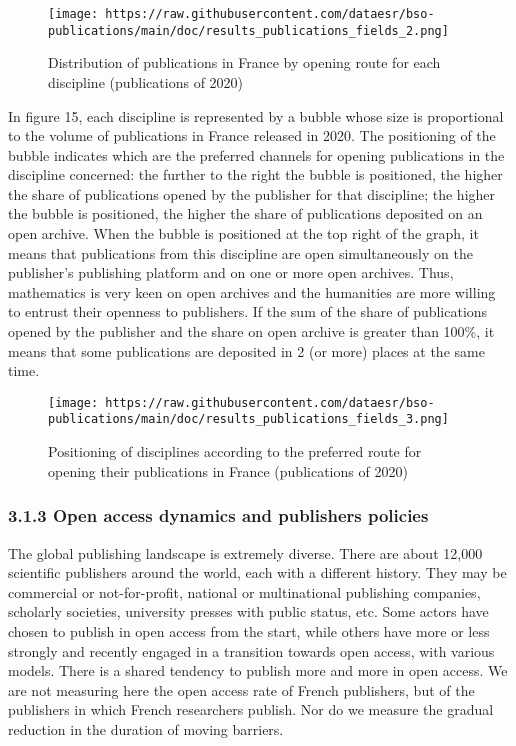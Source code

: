 \documentclass[
]{article}
\begin{document}
\begin{figure}
\centering
\texttt{[image: https://raw.githubusercontent.com/dataesr/bso-publications/main/doc/results\_publications\_fields\_2.png]}
\caption{Distribution of publications in France by opening route for
each discipline (publications of 2020)}
\end{figure}

In figure 15, each discipline is represented by a bubble whose size is
proportional to the volume of publications in France released in 2020.
The positioning of the bubble indicates which are the preferred channels
for opening publications in the discipline concerned: the further to the
right the bubble is positioned, the higher the share of publications
opened by the publisher for that discipline; the higher the bubble is
positioned, the higher the share of publications deposited on an open
archive. When the bubble is positioned at the top right of the graph, it
means that publications from this discipline are open simultaneously on
the publisher's publishing platform and on one or more open archives.
Thus, mathematics is very keen on open archives and the humanities are
more willing to entrust their openness to publishers. If the sum of the
share of publications opened by the publisher and the share on open
archive is greater than 100\%, it means that some publications are
deposited in 2 (or more) places at the same time.

\begin{figure}
\centering
\texttt{[image: https://raw.githubusercontent.com/dataesr/bso-publications/main/doc/results\_publications\_fields\_3.png]}
\caption{Positioning of disciplines according to the preferred route for
opening their publications in France (publications of 2020)}
\end{figure}

\hypertarget{open-access-dynamics-and-publishers-policies}{%
\subsubsection{3.1.3 Open access dynamics and publishers
policies}\label{open-access-dynamics-and-publishers-policies}}

The global publishing landscape is extremely diverse. There are about
12,000 scientific publishers around the world, each with a different
history. They may be commercial or not-for-profit, national or
multinational publishing companies, scholarly societies, university
presses with public status, etc. Some actors have chosen to publish in
open access from the start, while others have more or less strongly and
recently engaged in a transition towards open access, with various
models. There is a shared tendency to publish more and more in open
access. We are not measuring here the open access rate of French
publishers, but of the publishers in which French researchers publish.
Nor do we measure the gradual reduction in the duration of moving
barriers.
\end{document}
